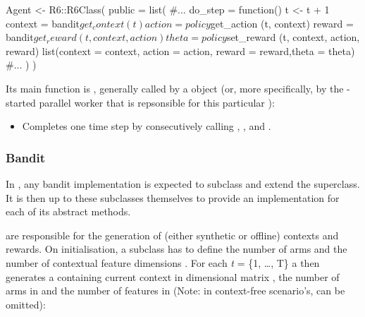 \documentclass{jss}
\begin{document}
\begin{Code}
Agent <- R6::R6Class(
  public = list(
    #...
    do_step = function() {
      t <- t + 1
      context = bandit$get_context(t)
      action  = policy$get_action (t, context)
      reward  = bandit$get_reward (t, context, action)
      theta   = policy$set_reward (t, context, action, reward)
      list(context = context, action = action, reward = reward,theta = theta)
    }
    #...
  )
)
\end{Code}

Its main function is , generally called by a  object (or, more specifically, by the -started parallel worker that is repsonsible for this particular ):

\begin{itemize}
   \item{}{
      Completes one time step  by consecutively calling
      , ,  and .
    }
\end{itemize}

\subsubsection{Bandit}

In , any bandit implementation is expected to subclass and extend the  superclass. It is then up to these subclasses themselves to provide an implementation for each of its abstract methods.

 are responsible for the generation of (either synthetic or offline) contexts and rewards. On initialisation, a  subclass has to define the number of arms  and the number of contextual feature dimensions . For each \emph{t} = \{1, \ldots, T\} a  then generates a  containing current context in  dimensional matrix , the number of arms in  and the number of features in  (Note: in context-free scenario's,  can be omitted):
\end{document}
